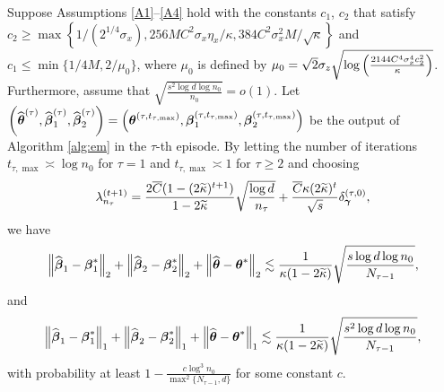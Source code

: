 \begin{theorem}\label{thm:1-detailed}
	Suppose Assumptions \ref{A1}--\ref{A4} hold with the constants  $c_1$, $c_2$ that satisfy $c_2  \geq \max\left\{1/(2^{1/4}\sigma_x), 256MC^2\sigma_x\eta_x/\kappa, 384C^2\sigma_x^2M/\sqrt{\kappa}\right\}$ and $c_1 \leq \min\{1/4M, 2/\mu_0\}$, where $\mu_0$ is defined by $\mu_0= \sqrt{2}\sigma_z\sqrt{\log\left( \frac{2144C^4\sigma_x^4c_2^2}{\kappa} \right)}$. Furthermore,  assume that $\sqrt{\frac{s^2\log d\log n_0}{n_0}} =o(1)$. Let $\left(\widehat{\boldsymbol{\theta}}^{(\tau)},\widehat{\boldsymbol{\beta}}_{1}^{(\tau)},\widehat{\boldsymbol{\beta}}_{2}^{(\tau)}\right)=\left(\boldsymbol{\theta}^{(\tau,t_{\tau, \max})},\boldsymbol{\beta}^{(\tau, t_{\tau, \max})}_{1},\boldsymbol{\beta}^{(\tau, t_{\tau, \max})}_{2}\right)$ be the output of Algorithm \ref{alg:em} in the $\tau$-th episode. By letting the number of iterations $t_{\tau, \max} \asymp \log n_0$ for $\tau=1$ and $t_{\tau, \max} \asymp 1$  for $\tau \geq 2$ and choosing \[\lambda_{n_{\tau}}^{(t+1)}=\frac{2\overline{C}(1-(2\widetilde\kappa)^{t+1})}{1-2\widetilde\kappa}\sqrt{\frac{\log d}{n_{\tau}}}+\frac{\overline{C}\kappa(2\widetilde\kappa)^{t}}{\sqrt{s}}\delta_{\boldsymbol{\gamma}}^{(\tau, 0)}, \]
	we have
	\begin{equation}
		\left\lVert\widehat{\boldsymbol{\beta}}_{1} - \boldsymbol{\beta}_{1}^*\right\rVert_2 + \left\lVert\widehat{\boldsymbol{\beta}}_{2} - \boldsymbol{\beta}_{2}^*\right\rVert_2 + \left\lVert\widehat{\boldsymbol{\theta}} - \boldsymbol{\theta}^*\right\rVert_2
		\lesssim \frac{1}{\kappa(1-2\widetilde\kappa)}\sqrt{\frac{s\log d\log n_0}{N_{\tau-1}}}, 
	\end{equation}
	and
	\begin{equation}
		\left\lVert\widehat{\boldsymbol{\beta}}_{1} - \boldsymbol{\beta}_{1}^*\right\rVert_1 + \left\lVert\widehat{\boldsymbol{\beta}}_{2} - \boldsymbol{\beta}_{2}^*\right\rVert_1 + \left\lVert\widehat{\boldsymbol{\theta}} - \boldsymbol{\theta}^*\right\rVert_1
		\lesssim   \frac{1}{\kappa(1-2\widetilde\kappa)}\sqrt{\frac{s^2\log d\log n_0}{N_{\tau-1}}},
	\end{equation}
	with probability at least $1-\frac{c\log^3 n_0}{\max^2\{N_{\tau-1}, d\}}$ for some constant $c$.
\end{theorem}

